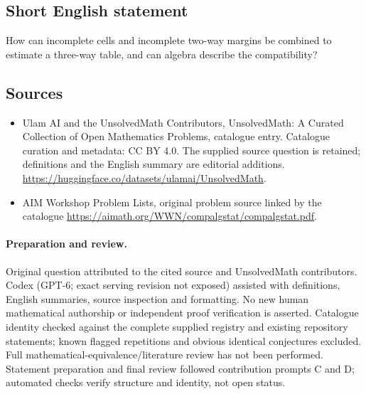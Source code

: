\documentclass[11pt]{article}
\begin{document}
\subsection{Short English statement}
How can incomplete cells and incomplete two-way margins be combined to estimate a three-way table, and can algebra describe the compatibility?
\subsection{Sources}
\begin{itemize}
\item[\hypertarget{source:statement:1}{S1}] Ulam AI and the UnsolvedMath Contributors, UnsolvedMath: A Curated Collection of Open Mathematics Problems, catalogue entry. Catalogue curation and metadata: CC BY 4.0. The supplied source question is retained; definitions and the English summary are editorial additions.
\url{https://huggingface.co/datasets/ulamai/UnsolvedMath}.
\item[\hypertarget{source:statement:2}{S2}] AIM Workshop Problem Lists, original problem source linked by the catalogue
\url{https://aimath.org/WWN/compalgstat/compalgstat.pdf}.
\end{itemize}
\paragraph{Preparation and review.}
Original question attributed to the cited source and UnsolvedMath contributors. Codex (GPT-6; exact serving revision not exposed) assisted with definitions, English summaries, source inspection and formatting. No new human mathematical authorship or independent proof verification is asserted. Catalogue identity checked against the complete supplied registry and existing repository statements; known flagged repetitions and obvious identical conjectures excluded. Full mathematical-equivalence/literature review has not been performed. Statement preparation and final review followed contribution prompts C and D; automated checks verify structure and identity, not open status.
\label{end:statement}
\end{document}
